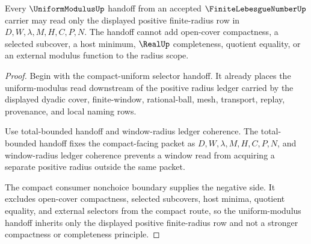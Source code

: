 \begin{theorem}
\label{thm:finite-lebesgue-number-uniform-modulus-radius-scope}
Every $\UniformModulusUp$ handoff from an accepted $\FiniteLebesgueNumberUp$ carrier may read only the displayed positive finite-radius row in $D,W,\lambda,M,H,C,P,N$. The handoff cannot add open-cover compactness, a selected subcover, a host minimum, $\RealUp$ completeness, quotient equality, or an external modulus function to the radius scope.
\end{theorem}
\begin{proof}
Begin with the compact-uniform selector handoff. It already places the uniform-modulus read downstream of the positive radius ledger carried by the displayed dyadic cover, finite-window, rational-ball, mesh, transport, replay, provenance, and local naming rows.

Use total-bounded handoff and window-radius ledger coherence. The total-bounded handoff fixes the compact-facing packet as $D,W,\lambda,M,H,C,P,N$, and window-radius ledger coherence prevents a window read from acquiring a separate positive radius outside the same packet.

The compact consumer nonchoice boundary supplies the negative side. It excludes open-cover compactness, selected subcovers, host minima, quotient equality, and external selectors from the compact route, so the uniform-modulus handoff inherits only the displayed positive finite-radius row and not a stronger compactness or completeness principle.
\end{proof}

